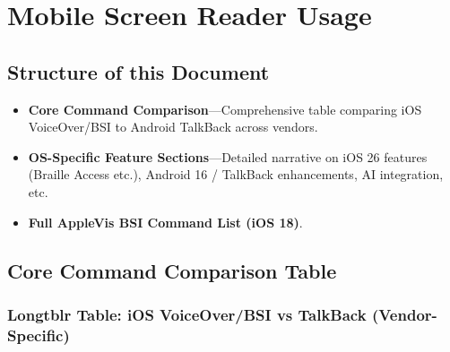 \chapter{Mobile Screen Reader Usage}

\section{Structure of this Document}
\begin{itemize}
	\item \textbf{Core Command Comparison}—Comprehensive table comparing iOS VoiceOver/BSI to Android TalkBack across vendors.
	\item \textbf{OS-Specific Feature Sections}—Detailed narrative on iOS 26 features (Braille Access etc.), Android 16 / TalkBack enhancements, AI integration, etc.
	\item \textbf{Full AppleVis BSI Command List (iOS 18)}.
\end{itemize}

\section{Core Command Comparison Table}
\subsection{Longtblr Table: iOS VoiceOver/BSI vs TalkBack (Vendor-Specific)}

